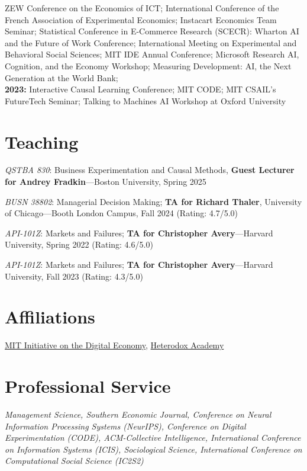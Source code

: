 \documentclass[margin,line,pifont,palatino,courier, 9pt]{res}
\begin{document}
\begin{resume}
ZEW Conference on the Economics of ICT;
International Conference of the French Association of Experimental Economics;
Instacart Economics Team Seminar;
Statistical Conference in E-Commerce Research (SCECR):
Wharton AI and the Future of Work Conference; 
International Meeting on Experimental and Behavioral Social Sciences;
MIT IDE Annual Conference; 
Microsoft Research AI, Cognition, and the Economy Workshop; 
Measuring Development: AI, the Next Generation at the World Bank; 
\vspace{2mm}\\
\textbf{2023:} Interactive Causal Learning Conference; 
MIT CODE; 
MIT CSAIL's FutureTech Seminar;
Talking to Machines AI Workshop at Oxford University

\section{\sc Teaching}
\textit{QSTBA 830}: Business Experimentation and Causal Methods, \textbf{Guest Lecturer for Andrey Fradkin}---Boston University, Spring 2025

\textit{BUSN 38802}: Managerial Decision Making; \textbf{TA for Richard Thaler}, University of Chicago---Booth London Campus, Fall 2024 (Rating: 4.7/5.0)

\textit{API-101Z}: Markets and Failures; \textbf{TA for Christopher Avery}---Harvard University, Spring 2022 (Rating: 4.6/5.0)

\textit{API-101Z}: Markets and Failures; \textbf{TA for Christopher Avery}---Harvard University, Fall 2023 (Rating: 4.3/5.0)

\section{\sc Affiliations}
\href{https://ide.mit.edu/}{MIT Initiative on the Digital Economy}, \href{https://heterodoxacademy.org/}{Heterodox Academy}

\section{\sc Professional Service}
\textit{Management Science, Southern Economic Journal, Conference on Neural Information Processing Systems (NeurIPS), Conference on Digital Experimentation (CODE), ACM-Collective Intelligence, International Conference on Information Systems (ICIS), Sociological Science, International Conference on Computational Social Science (IC2S2)}


\end{resume}
\end{document}
